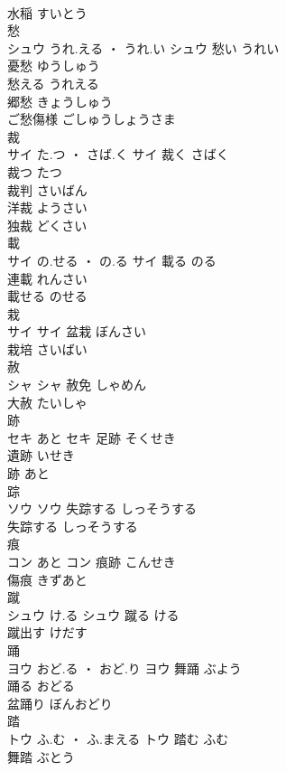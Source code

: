 \documentclass[8pt]{extreport}
\begin{document}
\begin{CJK}{UTF8}{min}
\\	水稲	すいとう	
\\	愁	
\\	シュウ	うれ.える ・ うれ.い	シュウ	愁い	うれい	
\\	憂愁	ゆうしゅう	
\\	愁える	うれえる	
\\	郷愁	きょうしゅう	
\\	ご愁傷様	ごしゅうしょうさま	
\\	裁	
\\	サイ	た.つ ・ さば.く	サイ	裁く	さばく	
\\	裁つ	たつ	
\\	裁判	さいばん	
\\	洋裁	ようさい	
\\	独裁	どくさい	
\\	載	
\\	サイ	の.せる ・ の.る	サイ	載る	のる	
\\	連載	れんさい	
\\	載せる	のせる	
\\	栽	
\\	サイ		サイ	盆栽	ぼんさい	
\\	栽培	さいばい	
\\	赦	
\\	シャ		シャ	赦免	しゃめん	
\\	大赦	たいしゃ	
\\	跡	
\\	セキ	あと	セキ	足跡	そくせき	
\\	遺跡	いせき	
\\	跡	あと	
\\	踪	
\\	ソウ		ソウ	失踪する	しっそうする	
\\	失踪する	しっそうする	
\\	痕	
\\	コン	あと	コン	痕跡	こんせき	
\\	傷痕	きずあと	
\\	蹴	
\\	シュウ	け.る	シュウ	蹴る	ける	
\\	蹴出す	けだす	
\\	踊	
\\	ヨウ	おど.る ・ おど.り	ヨウ	舞踊	ぶよう	
\\	踊る	おどる	
\\	盆踊り	ぼんおどり	
\\	踏	
\\	トウ	ふ.む ・ ふ.まえる	トウ	踏む	ふむ	
\\	舞踏	ぶとう	

\end{CJK}
\end{document}
